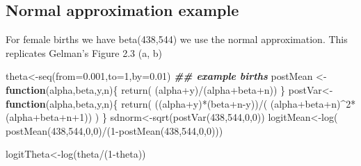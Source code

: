\documentclass[
]{book}
\newenvironment{Shaded}{\begin{snugshade}}{\end{snugshade}}
\newcommand{\AttributeTok}[1]{\textcolor[rgb]{0.77,0.63,0.00}{#1}}
\newcommand{\ControlFlowTok}[1]{\textcolor[rgb]{0.13,0.29,0.53}{\textbf{#1}}}
\newcommand{\DecValTok}[1]{\textcolor[rgb]{0.00,0.00,0.81}{#1}}
\newcommand{\DocumentationTok}[1]{\textcolor[rgb]{0.56,0.35,0.01}{\textbf{\textit{#1}}}}
\newcommand{\FloatTok}[1]{\textcolor[rgb]{0.00,0.00,0.81}{#1}}
\newcommand{\FunctionTok}[1]{\textcolor[rgb]{0.00,0.00,0.00}{#1}}
\newcommand{\NormalTok}[1]{#1}
\newcommand{\OtherTok}[1]{\textcolor[rgb]{0.56,0.35,0.01}{#1}}
\newcommand{\SpecialCharTok}[1]{\textcolor[rgb]{0.00,0.00,0.00}{#1}}
\theoremstyle{definition}
\theoremstyle{definition}
\theoremstyle{definition}
\theoremstyle{definition}
\theoremstyle{remark}
\begin{document}
\hypertarget{normal-approximation-example}{%
\subsection*{Normal approximation example}\label{normal-approximation-example}}

For female births we have beta(438,544) we use the normal approximation. This replicates Gelman's Figure 2.3 (a, b)

\begin{Shaded}
\begin{Highlighting}[]
\NormalTok{  theta}\OtherTok{\textless{}{-}}\FunctionTok{seq}\NormalTok{(}\AttributeTok{from=}\FloatTok{0.001}\NormalTok{,}\AttributeTok{to=}\DecValTok{1}\NormalTok{,}\AttributeTok{by=}\FloatTok{0.01}\NormalTok{)}
  \DocumentationTok{\#\# example births}
\NormalTok{   postMean }\OtherTok{\textless{}{-}}\ControlFlowTok{function}\NormalTok{(alpha,beta,y,n)\{}
     \FunctionTok{return}\NormalTok{( (alpha}\SpecialCharTok{+}\NormalTok{y)}\SpecialCharTok{/}\NormalTok{(alpha}\SpecialCharTok{+}\NormalTok{beta}\SpecialCharTok{+}\NormalTok{n))}
\NormalTok{   \} }
\NormalTok{   postVar}\OtherTok{\textless{}{-}}\ControlFlowTok{function}\NormalTok{(alpha,beta,y,n)\{}
     \FunctionTok{return}\NormalTok{( ((alpha}\SpecialCharTok{+}\NormalTok{y)}\SpecialCharTok{*}\NormalTok{(beta}\SpecialCharTok{+}\NormalTok{n}\SpecialCharTok{{-}}\NormalTok{y))}\SpecialCharTok{/}\NormalTok{( (alpha}\SpecialCharTok{+}\NormalTok{beta}\SpecialCharTok{+}\NormalTok{n)}\SpecialCharTok{\^{}}\DecValTok{2}\SpecialCharTok{*}\NormalTok{(alpha}\SpecialCharTok{+}\NormalTok{beta}\SpecialCharTok{+}\NormalTok{n}\SpecialCharTok{+}\DecValTok{1}\NormalTok{)) )}
\NormalTok{   \}}
\NormalTok{   sdnorm}\OtherTok{\textless{}{-}}\FunctionTok{sqrt}\NormalTok{(}\FunctionTok{postVar}\NormalTok{(}\DecValTok{438}\NormalTok{,}\DecValTok{544}\NormalTok{,}\DecValTok{0}\NormalTok{,}\DecValTok{0}\NormalTok{))}
\NormalTok{   logitMean}\OtherTok{\textless{}{-}}\FunctionTok{log}\NormalTok{( }\FunctionTok{postMean}\NormalTok{(}\DecValTok{438}\NormalTok{,}\DecValTok{544}\NormalTok{,}\DecValTok{0}\NormalTok{,}\DecValTok{0}\NormalTok{)}\SpecialCharTok{/}\NormalTok{(}\DecValTok{1}\SpecialCharTok{{-}}\FunctionTok{postMean}\NormalTok{(}\DecValTok{438}\NormalTok{,}\DecValTok{544}\NormalTok{,}\DecValTok{0}\NormalTok{,}\DecValTok{0}\NormalTok{)))}
   
\NormalTok{  logitTheta}\OtherTok{\textless{}{-}}\FunctionTok{log}\NormalTok{(theta}\SpecialCharTok{/}\NormalTok{(}\DecValTok{1}\SpecialCharTok{{-}}\NormalTok{theta))}


\end{Highlighting}
\end{Shaded}
\end{document}
